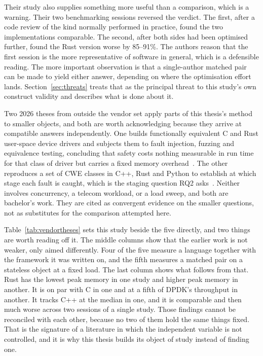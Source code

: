 \documentclass[english,oneside,a4paper,censored,csm,software-track-2020]{HYthesisML}
\begin{document}
Their study also supplies something more useful than a comparison, which is a warning.
Their two benchmarking sessions reversed the verdict. The first, after a code review of the kind
normally performed in practice, found the two implementations comparable. The second, after both
sides had been optimised further, found the Rust version worse by 85--91\%. The authors reason
that the first session is the more representative of software in general, which is a defensible
reading. The more important observation is that a single-author matched pair can be made to
yield either answer, depending on where the optimisation effort lands.
Section~\ref{sec:threats} treats that as the principal threat to this study's own construct
validity and describes what is done about it.

Two 2026 theses from outside the vendor set apply parts of this thesis's method to smaller
objects, and both are worth acknowledging because they arrive at compatible answers
independently. One builds functionally equivalent C and Rust user-space device drivers and
subjects them to fault injection, fuzzing and equivalence testing, concluding that safety costs
nothing measurable in run time for that class of driver but carries a fixed memory
overhead~\cite{sundvisson2026drivers}. The other reproduces a set of CWE classes in C++, Rust and
Python to establish at which stage each fault is caught, which is the staging question RQ2
asks~\cite{andersson2026stdmemsafety}. Neither involves concurrency, a telecom workload, or a load
sweep, and both are bachelor's work. They are cited as convergent evidence on the smaller
questions, not as substitutes for the comparison attempted here.

Table~\ref{tab:vendortheses} sets this study beside the five directly, and two things are worth
reading off it. The middle columns show that the earlier work is not weaker, only aimed
differently. Four of the five measure a language together with the framework it was written on,
and the fifth measures a matched pair on a stateless object at a fixed load. The last column shows
what follows from that. Rust has the lowest peak memory in one study and higher peak memory in
another. It is on par with C in one and at a fifth of DPDK's throughput in another. It tracks C++
at the median in one, and it is comparable and then much worse across two sessions of a single
study. Those findings cannot be reconciled with each other, because no two of them hold the same
things fixed. That is the signature of a literature in which the independent
variable is not controlled, and it is why this thesis builds its object of study instead of
finding one.
\end{document}

